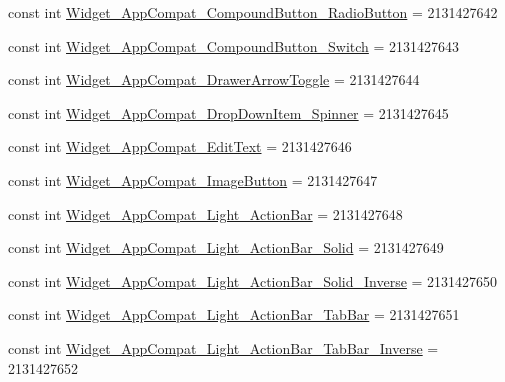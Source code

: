 \begin{DoxyCompactItemize}
const int \mbox{\hyperlink{class_f_w_p_s___app_1_1_droid_1_1_resource_1_1_style_adffe76f09d667f39d7cb6eb8b3b2b941}{Widget\+\_\+\+App\+Compat\+\_\+\+Compound\+Button\+\_\+\+Radio\+Button}} = 2131427642
\item 
const int \mbox{\hyperlink{class_f_w_p_s___app_1_1_droid_1_1_resource_1_1_style_a4062cdef4337072280d9ef2448892961}{Widget\+\_\+\+App\+Compat\+\_\+\+Compound\+Button\+\_\+\+Switch}} = 2131427643
\item 
const int \mbox{\hyperlink{class_f_w_p_s___app_1_1_droid_1_1_resource_1_1_style_a19e6d22f4466a65db0c505a0dd79636a}{Widget\+\_\+\+App\+Compat\+\_\+\+Drawer\+Arrow\+Toggle}} = 2131427644
\item 
const int \mbox{\hyperlink{class_f_w_p_s___app_1_1_droid_1_1_resource_1_1_style_a1df21c12e0aa1117ecc89f452499d642}{Widget\+\_\+\+App\+Compat\+\_\+\+Drop\+Down\+Item\+\_\+\+Spinner}} = 2131427645
\item 
const int \mbox{\hyperlink{class_f_w_p_s___app_1_1_droid_1_1_resource_1_1_style_a40cf00a29cb81e7f60a55fb12b8c3e49}{Widget\+\_\+\+App\+Compat\+\_\+\+Edit\+Text}} = 2131427646
\item 
const int \mbox{\hyperlink{class_f_w_p_s___app_1_1_droid_1_1_resource_1_1_style_a383bde5dc6cdebb1a96cf47931d092dc}{Widget\+\_\+\+App\+Compat\+\_\+\+Image\+Button}} = 2131427647
\item 
const int \mbox{\hyperlink{class_f_w_p_s___app_1_1_droid_1_1_resource_1_1_style_ab9f86093aef24e9fcadefc76abc140e0}{Widget\+\_\+\+App\+Compat\+\_\+\+Light\+\_\+\+Action\+Bar}} = 2131427648
\item 
const int \mbox{\hyperlink{class_f_w_p_s___app_1_1_droid_1_1_resource_1_1_style_a4eaaf93b2db408dffc7d7de0b21f5209}{Widget\+\_\+\+App\+Compat\+\_\+\+Light\+\_\+\+Action\+Bar\+\_\+\+Solid}} = 2131427649
\item 
const int \mbox{\hyperlink{class_f_w_p_s___app_1_1_droid_1_1_resource_1_1_style_a2664df9890fd8366581ca35c7b1ceeaa}{Widget\+\_\+\+App\+Compat\+\_\+\+Light\+\_\+\+Action\+Bar\+\_\+\+Solid\+\_\+\+Inverse}} = 2131427650
\item 
const int \mbox{\hyperlink{class_f_w_p_s___app_1_1_droid_1_1_resource_1_1_style_a7eb744b27a34cf0f78bdcff3b35c6e67}{Widget\+\_\+\+App\+Compat\+\_\+\+Light\+\_\+\+Action\+Bar\+\_\+\+Tab\+Bar}} = 2131427651
\item 
const int \mbox{\hyperlink{class_f_w_p_s___app_1_1_droid_1_1_resource_1_1_style_acc44ecc2eb9a3c4ace22ff549045001a}{Widget\+\_\+\+App\+Compat\+\_\+\+Light\+\_\+\+Action\+Bar\+\_\+\+Tab\+Bar\+\_\+\+Inverse}} = 2131427652

\end{DoxyCompactItemize}
